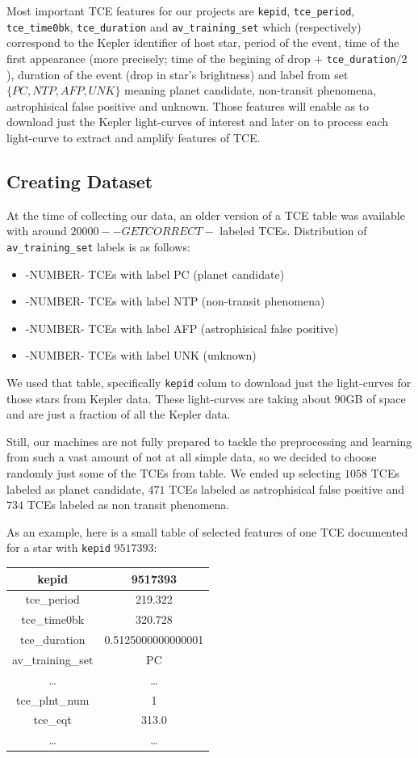\documentclass[twoside]{article}
\newcommand{\code}[1]{\texttt{#1}}
\begin{document}
\begin{multicols}{2}
Most important TCE features for our projects are \code{kepid}, \code{tce\_period}, \code{tce\_time0bk}, \code{tce\_duration} and \code{av\_training\_set} which (respectively) correspond to the Kepler identifier of host star, period of the event, time of the first appearance (more precisely; time of the begining of drop $+$ \code{tce\_duration}$/2$), duration of the event (drop in star's brightness) and label from set $\{PC,NTP,AFP,UNK\}$ meaning planet candidate, non-transit phenomena, astrophisical false positive and unknown. Those features will enable as to download just the Kepler light-curves of interest and later on to process each light-curve to extract and amplify features of TCE.

\subsection{Creating Dataset}
At the time of collecting our data, an older version of a TCE table was available with around $20000 --GETCORRECT-$ labeled TCEs. Distribution of \code{av\_training\_set} labels is as follows:
\begin{itemize}
	\item -NUMBER- TCEs with label PC (planet candidate)
    \item -NUMBER- TCEs with label NTP (non-transit phenomena)
    \item -NUMBER- TCEs with label AFP (astrophisical false positive)
    \item -NUMBER- TCEs with label UNK (unknown)
\end{itemize}
We used that table, specifically \code{kepid} colum to download just the light-curves for those stars from Kepler data. These light-curves are taking about $90$GB of space and are just a fraction of all the Kepler data.

Still, our machines are not fully prepared to tackle the preprocessing and learning from such a vast amount of not at all simple data, so we decided to choose randomly just some of the TCEs from table. We ended up selecting $1058$ TCEs labeled as planet candidate, $471$ TCEs labeled as astrophisical false positive and $734$ TCEs labeled as non transit phenomena.

As an example, here is a small table of selected features of one TCE documented for a star with \code{kepid} $9517393$:
\begin{center}
  \begin{tabular}{||c | c||} 
    \hline
    kepid & 9517393 \\
    \hline
    tce\_period & 219.322 \\
    \hline
    tce\_time0bk & 320.728 \\
    \hline
    tce\_duration & 0.5125000000000001 \\
    \hline
    av\_training\_set & PC \\
    \hline
    \ldots & \ldots \\
    \hline
    tce\_plnt\_num & 1 \\
    \hline
    tce\_eqt & 313.0 \\
    \hline
    \ldots & \ldots
  \end{tabular}
\end{center}


\end{multicols}
\end{document}
